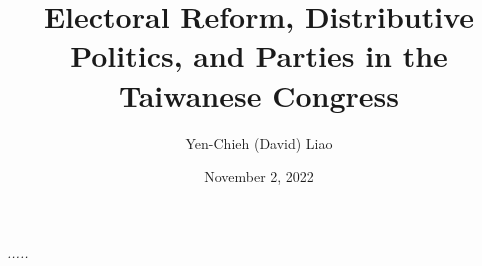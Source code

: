 \documentclass[12pt,leqno]{report}
\begin{document}
\sloppy
\title{Electoral Reform, Distributive Politics, 
            and Parties in the Taiwanese Congress} 
\author{Yen-Chieh (David) Liao}

\date{November 2, 2022}
\maketitle

\thispagestyle{plain}
\newenvironment{dedication}
{\cleardoublepage {}
  \begin{center} \em}
  {\end{center} \vspace*{\stretch{3}} }
\begin{dedication}
.....

\end{dedication}

\tableofcontents

\listoftables

\listoffigures

\begin{abstract}

\end{abstract}



\end{document}

